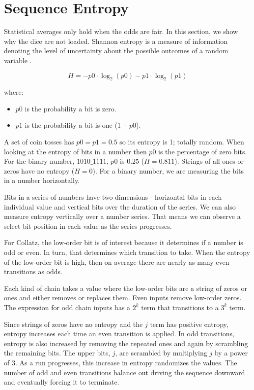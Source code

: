 \documentclass[preprint]{sigplanconf}
\begin{document}
\section{Sequence Entropy}

Statistical averages only hold when the odds are fair. In this section, we show why the dice are not loaded. Shannon entropy is a measure of information denoting the level of uncertainty about the possible outcomes of a random variable \cite{1}.

\[
    H = -p0 \cdot \log_2(p0) - p1 \cdot \log_2(p1)
\]

where:
\begin{itemize}
    \item $p0$ is the probability a bit is zero.
    \item $p1$ is the probability a bit is one ($1 - p0$).
\end{itemize}

A set of coin tosses has $p0 = p1 = 0.5$ so its entropy is 1; totally random. When looking at the entropy of bits in a number then $p0$ is the percentage of zero bits. For the binary number, $1010\_1111$, $p0$ is $0.25$ ($H = 0.811$). Strings of all ones or zeros have no entropy ($H = 0$). For a binary number, we are measuring the bits in a number horizontally.

Bits in a series of numbers have two dimensions - horizontal bits in each individual value and vertical bits over the duration of the series. We can also measure entropy vertically over a number series. That means we can observe a select bit position in each value as the series progresses.

For Collatz, the low-order bit is of interest because it determines if a number is odd or even. In turn, that determines which transition to take. When the entropy of the low-order bit is high, then on average there are nearly as many even transitions as odds.

Each kind of chain takes a value where the low-order bits are a string of zeros or ones and either removes or replaces them. Even inputs remove low-order zeros. The expression for odd chain inputs has a $2^k$ term that transitions to a $3^k$ term.

Since strings of zeros have no entropy and the $j$ term has positive entropy, entropy increases each time an even transition is applied. In odd transitions, entropy is also increased by removing the repeated ones and again by scrambling the remaining bits. The upper bits, $j$, are scrambled by multiplying $j$ by a power of 3. As a run progresses, this increase in entropy randomizes the values. The number of odd and even transitions balance out driving the sequence downward and eventually forcing it to terminate.
\end{document}
